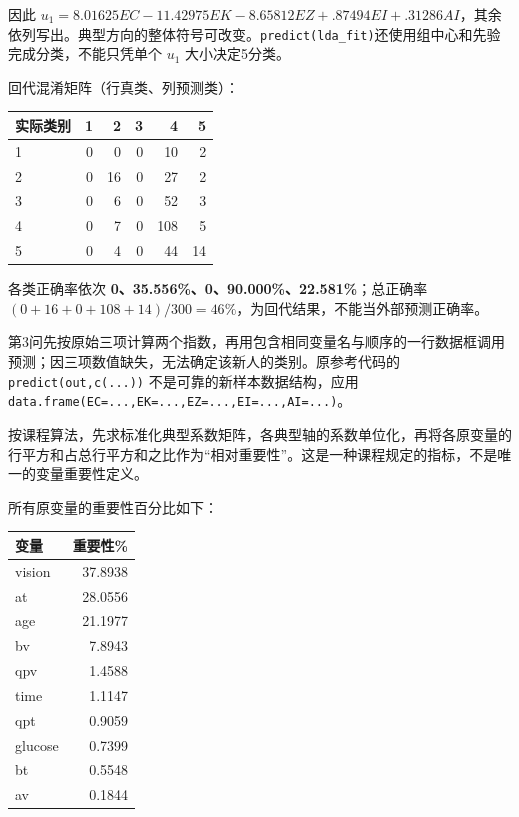 因此 \(u_1=8.01625EC-11.42975EK-8.65812EZ+.87494EI+.31286AI\)，其余依列写出。典型方向的整体符号可改变。\texttt{predict(lda\_fit)}还使用组中心和先验完成分类，不能只凭单个 \(u_1\) 大小决定5分类。

回代混淆矩阵（行真类、列预测类）：

\begin{center}\small\setlength{\tabcolsep}{4pt}\renewcommand{\arraystretch}{1.18}\begin{tabular}{@{}lrrrrr@{}}
\toprule
实际类别 & 1 & 2 & 3 & 4 & 5 \\
\midrule

1 & 0 & 0 & 0 & 10 & 2 \\
2 & 0 & 16 & 0 & 27 & 2 \\
3 & 0 & 6 & 0 & 52 & 3 \\
4 & 0 & 7 & 0 & 108 & 5 \\
5 & 0 & 4 & 0 & 44 & 14 \\
\bottomrule\end{tabular}\end{center}

各类正确率依次 \textbf{0、35.556\%、0、90.000\%、22.581\%}；总正确率 \((0+16+0+108+14)/300=46\%\)，为回代结果，不能当外部预测正确率。

第3问先按原始三项计算两个指数，再用包含相同变量名与顺序的一行数据框调用预测；因三项数值缺失，无法确定该新人的类别。原参考代码的 \texttt{predict(out,c(...))} 不是可靠的新样本数据结构，应用 \texttt{data.frame(EC=...,EK=...,EZ=...,EI=...,AI=...)}。



按课程算法，先求标准化典型系数矩阵，各典型轴的系数单位化，再将各原变量的行平方和占总行平方和之比作为``相对重要性''。这是一种课程规定的指标，不是唯一的变量重要性定义。

所有原变量的重要性百分比如下：

\begin{center}\small\setlength{\tabcolsep}{4pt}\renewcommand{\arraystretch}{1.18}\begin{tabular}{@{}lr@{}}
\toprule
变量 & 重要性\% \\
\midrule

vision & 37.8938 \\
at & 28.0556 \\
age & 21.1977 \\
bv & 7.8943 \\
qpv & 1.4588 \\
time & 1.1147 \\
qpt & 0.9059 \\
glucose & 0.7399 \\
bt & 0.5548 \\
av & 0.1844 \\
\bottomrule\end{tabular}\end{center}

